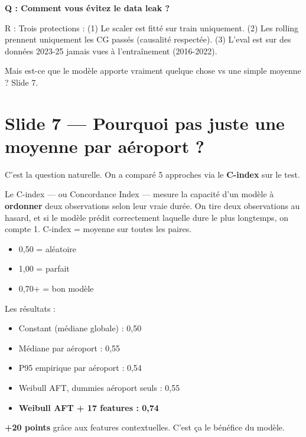 \documentclass[11pt,a4paper]{article}
\begin{document}
\begin{piege}
\textbf{Q : Comment vous évitez le data leak ?}

R : Trois protections : (1) Le scaler est fitté sur train uniquement. (2) Les rolling
prennent uniquement les CG passés (causalité respectée). (3) L'eval est sur des données
2023-25 jamais vues à l'entraînement (2016-2022).
\end{piege}

\begin{transit}
\og Mais est-ce que le modèle apporte vraiment quelque chose vs une simple moyenne ?
Slide 7. \fg{}
\end{transit}

\section{Slide 7 — Pourquoi pas juste une moyenne par aéroport ?}

\begin{dire}
\og C'est la question naturelle. On a comparé 5 approches via le \textbf{C-index} sur le test.

Le C-index — ou Concordance Index — mesure la capacité d'un modèle à \textbf{ordonner} deux
observations selon leur vraie durée. On tire deux observations au hasard, et si le modèle
prédit correctement laquelle dure le plus longtemps, on compte 1. C-index = moyenne sur
toutes les paires.
\begin{itemize}
    \item 0,50 = aléatoire
    \item 1,00 = parfait
    \item 0,70+ = bon modèle
\end{itemize}

Les résultats :
\begin{itemize}
    \item Constant (médiane globale) : 0,50
    \item Médiane par aéroport : 0,55
    \item P95 empirique par aéroport : 0,54
    \item Weibull AFT, dummies aéroport seuls : 0,55
    \item \textbf{Weibull AFT + 17 features : 0,74}
\end{itemize}

\textbf{+20 points} grâce aux features contextuelles. C'est ça le bénéfice du modèle. \fg{}
\end{dire}
\end{document}
